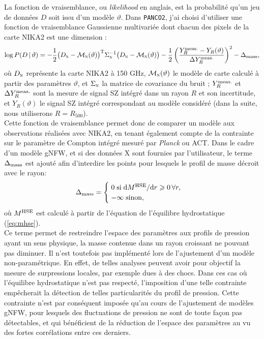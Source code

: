 La fonction de vraisemblance, ou \textit{likelihood} en anglais, est la probabilité qu'un jeu de données $D$ soit issu d'un modèle $\vartheta$.
Dans \texttt{PANCO2}, j'ai choisi d'utiliser une fonction de vraisemblance Gaussienne multivariée dont chacun des pixels de la carte NIKA2 est une dimension :
\begin{equation}
    \label{eq:panco:like}
    \mathrm{log} \, P(D \, | \, \vartheta)
    = - \frac{1}{2}
        \big(D_\textsc{n} - \mathcal{M}_\textsc{n}(\vartheta)\big)^{\rm T}
        \Sigma_\textsc{n}^{-1}
        \big(D_\textsc{n} - \mathcal{M}_\textsc{n}(\vartheta)\big)
      - \frac{1}{2}
        \left(\frac{Y_R^{\rm meas.} - Y_R(\vartheta)}{\Delta Y_R^{\rm meas.}}\right)^2
      - \Delta_{\rm mass},
\end{equation}
où $D_\textsc{n}$ représente la carte NIKA2 à 150 GHz, $\mathcal{M}_\textsc{n}(\vartheta)$ le modèle de carte calculé à partir des paramètres $\vartheta$, et $\Sigma_\textsc{n}$ la matrice de covariance du bruit ;
$Y_R^{\rm meas.}$ et $\Delta Y_R^{\rm meas.}$ sont la mesure de signal SZ intégré dans un rayon $R$ et son incertitude, et $Y_R(\vartheta)$ le signal SZ intégré correspondant au modèle considéré (dans la suite, nous utiliserons $R = R_{500}$). \\
Cette fonction de vraisemblance permet donc de comparer un modèle aux observations réalisées avec NIKA2, en tenant également compte de la contrainte sur le paramètre de Compton intégré mesuré par \textit{Planck} ou ACT.
Dans le cadre d'un modèle gNFW, et si des données X sont fournies par l'utilisateur, le terme $\Delta_{\rm mass}$ est ajouté afin d'interdire les points pour lesquels le profil de masse décroit avec le rayon:
\begin{equation}
    \Delta_{\rm mass} =
        \begin{cases}
            \; 0 \;\text{si}\; \mathrm{d}M^{\rm HSE} / \mathrm{d}r \geqslant 0 \,\forall r, \\
            \; -\infty \;\text{sinon,}
        \end{cases}
\end{equation}
où $M^{\rm HSE}$ est calculé à partir de l'équation de l'équilibre hydrostatique (\ref{eq:mhse}). \\
Ce terme permet de restreindre l'espace des paramètres aux profils de pression ayant un sens physique, la masse contenue dans un rayon croissant ne pouvant pas diminuer.
Il n'est toutefois pas implémenté lors de l'ajustement d'un modèle non-paramétrique.
En effet, de telles analyses peuvent avoir pour objectif la mesure de surpressions locales, par exemple dues à des chocs.
Dans ces cas où l'équilibre hydrostatique n'est pas respecté, l'imposition d'une telle contrainte empêcherait la détection de telles particularités du profil de pression.
Cette contrainte n'est par conséquent imposée qu'au cours de l'ajustement de modèles gNFW, pour lesquels des fluctuations de pression ne sont de toute façon pas détectables, et qui bénéficient de la réduction de l'espace des paramètres au vu des fortes corrélations entre ces derniers.

